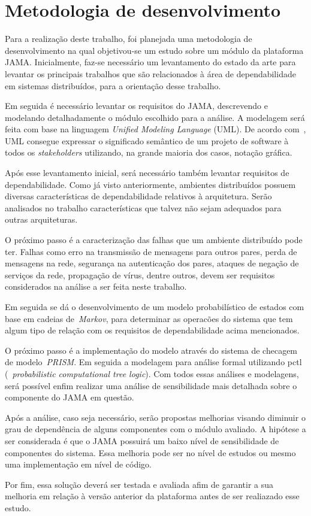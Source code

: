 \chapter{Metodologia de desenvolvimento}

Para a realização deste trabalho, foi planejada uma metodologia de desenvolvimento na qual objetivou-se um estudo sobre um módulo da plataforma JAMA. Inicialmente, faz-se necessário um levantamento do estado da arte para levantar os principais trabalhos que são relacionados à área de dependabilidade em sistemas distribuídos, para a orientação desse trabalho.

Em seguida é necessário levantar os requisitos do JAMA, descrevendo e modelando detalhadamente o módulo escolhido para a análise. A modelagem será feita com base na linguagem \emph{Unified Modeling Language} (UML). De acordo com~\cite{craig08}, UML consegue expressar o significado semântico de um projeto de software à todos os \emph{stakeholders} utilizando, na grande maioria dos casos, notação gráfica.

Após esse levantamento inicial, será necessário também levantar requisitos de dependabilidade.  Como já visto anteriormente, ambientes distribuídos possuem diversas características de dependabilidade relativos à arquitetura. Serão analisados no trabalho características que talvez não sejam adequados para outras arquiteturas.

O próximo passo é a caracterização das falhas que um ambiente distribuído pode ter. Falhas como erro na transmissão de mensagens para outros pares, perda de mensagens na rede, segurança na autenticação dos pares, ataques de negação de serviços da rede, propagação de vírus, dentre outros, devem ser requisitos considerados na análise a ser feita neste trabalho.

Em seguida se dá o desenvolvimento de um modelo probabilístico de estados com base em cadeias de~\emph{Markov}, para determinar as operacões do sistema que tem algum tipo de relação com os requisitos de dependabilidade acima mencionados.

O próximo passo é a implementação do modelo através do sistema de checagem de modelo~\emph{PRISM}. Em seguida a modelagem para análise formal utilizando pctl (~\emph{probabilistic computational tree logic}). Com todos essas análises e modelagens, será possível enfim realizar uma análise de sensibilidade mais detalhada sobre o componente do JAMA em questão.

Após a análise, caso seja necessário, serão propostas melhorias visando diminuir o grau de dependência de alguns componentes com o módulo avaliado. A hipótese a ser considerada é que o JAMA possuirá um baixo nível de sensibilidade de componentes do sistema. Essa melhoria pode ser no nível de estudos ou mesmo uma implementação em nível de código.

Por fim, essa solução deverá ser testada e avaliada afim de garantir a sua melhoria em relação à versão anterior da plataforma antes de ser realiazado esse estudo.
